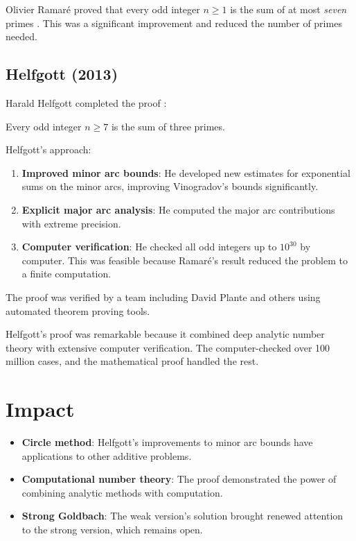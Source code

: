 Olivier Ramaré proved that every odd integer $n \geq 1$ is the sum of at most \emph{seven} primes \cite{ramare1995}. This was a significant improvement and reduced the number of primes needed.

\subsection{Helfgott (2013)}

Harald Helfgott completed the proof \cite{helfgott2013}:

\begin{theorem}
Every odd integer $n \geq 7$ is the sum of three primes.
\end{theorem}

Helfgott's approach:

\begin{enumerate}
\item \textbf{Improved minor arc bounds}: He developed new estimates for exponential sums on the minor arcs, improving Vinogradov's bounds significantly.
\item \textbf{Explicit major arc analysis}: He computed the major arc contributions with extreme precision.
\item \textbf{Computer verification}: He checked all odd integers up to $10^{30}$ by computer. This was feasible because Ramaré's result reduced the problem to a finite computation.
\end{enumerate}

The proof was verified by a team including David Plante and others using automated theorem proving tools.

\begin{highlightbox}
Helfgott's proof was remarkable because it combined deep analytic number theory with extensive computer verification. The computer-checked over 100 million cases, and the mathematical proof handled the rest.
\end{highlightbox}

\section{Impact}

\begin{itemize}
\item \textbf{Circle method}: Helfgott's improvements to minor arc bounds have applications to other additive problems.
\item \textbf{Computational number theory}: The proof demonstrated the power of combining analytic methods with computation.
\item \textbf{Strong Goldbach}: The weak version's solution brought renewed attention to the strong version, which remains open.
\end{itemize}


